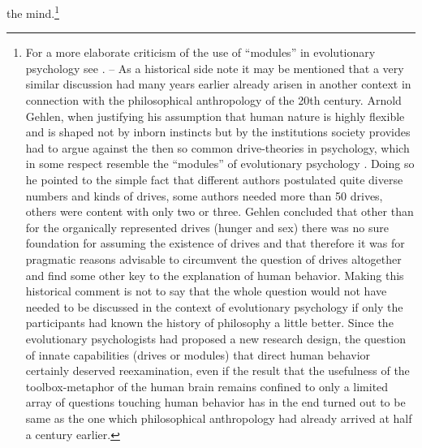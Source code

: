 the mind.\footnote{For a more elaborate criticism of the use of ``modules'' in
  evolutionary psychology see \cite[p.\  40ff]{dupre:2001}. -- As a historical
  side note it may be mentioned that a very similar discussion had many years
  earlier already arisen in another context in connection with the
  philosophical anthropology of the 20th century. Arnold Gehlen, when
  justifying his assumption that human nature is highly flexible and is shaped
  not by inborn instincts but by the institutions society provides had to
  argue against the then so common drive-theories in psychology, which in some
  respect resemble the ``modules'' of evolutionary psychology
  \cite[p.\ 50ff.]{gehlen:1942}. Doing so he pointed to the simple fact that
  different authors postulated quite diverse numbers and kinds of drives, some
  authors needed more than 50 drives, others were content with only two or
  three. Gehlen concluded that other than for the organically represented
  drives (hunger and sex) there was no sure foundation for assuming the
  existence of drives and that therefore it was for pragmatic reasons
  advisable to circumvent the question of drives altogether and find some
  other key to the explanation of human behavior. Making this historical
  comment is not to say that the whole question would not have needed to be
  discussed in the context of evolutionary psychology if only the participants
  had known the history of philosophy a little better. Since the evolutionary
  psychologists had proposed a new research design, the question of innate
  capabilities (drives or modules) that direct human behavior certainly
  deserved reexamination, even if the result that the usefulness of the
  toolbox-metaphor of the human brain remains confined to only a limited array
  of questions touching human behavior has in the end turned out to be
  same as the one which philosophical anthropology had already arrived at
  half a century earlier.}

